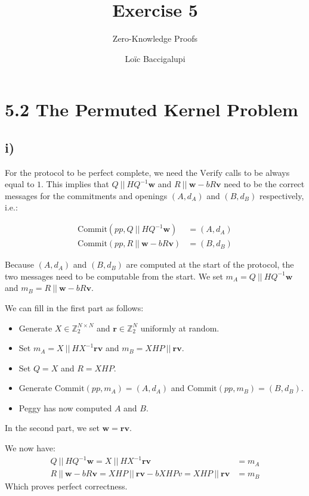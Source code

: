 \documentclass{scrartcl}
\title{Exercise 5}
\subtitle{Zero-Knowledge Proofs}
\author{Loïc Baccigalupi}
\begin{document}
\maketitle

\section*{5.2 The Permuted Kernel Problem}

\subsection*{i)}

For the protocol to be perfect complete, we need the $\text{Verify}$ calls to be always equal to $1$.
This implies that $Q\ ||\ HQ^{-1}\mathbf{w}$ and $R\ ||\ \mathbf{w} -bR\mathbf{v}$ need to be the correct messages for the commitments and openings $(A, d_A)$ and $(B, d_B)$ respectively, i.e.:

\begin{align*}
  \text{Commit}(pp, Q\ ||\ HQ^{-1}\mathbf{w}) &= (A, d_A) \\
  \text{Commit}(pp, R\ ||\ \mathbf{w} -bR\mathbf{v}) &= (B, d_B)
\end{align*}

Because $(A, d_A)$ and $(B, d_B)$ are computed at the start of the protocol, the two messages need to be computable from the start. We set $m_A = Q\ ||\ HQ^{-1}\mathbf{w}$ and $m_B = R\ ||\ \mathbf{w} -bR\mathbf{v}$.

We can fill in the first part as follows:
\begin{itemize}
  \item Generate $X \in \mathbb{Z}_2^{N \times N}$ and $\mathbf{r} \in \mathbb{Z}_2^N$ uniformly at random.
  \item Set $m_A = X\ ||\ HX^{-1}\mathbf{rv}$ and $m_B = XHP\ ||\ \mathbf{rv}$.
  \item Set $Q = X$ and $R = XHP$.
  \item Generate $\text{Commit}(pp, m_A) = (A, d_A)$ and $\text{Commit}(pp, m_B) = (B, d_B)$.
  \item Peggy has now computed $A$ and $B$.
\end{itemize}

In the second part, we set $\mathbf{w} = \mathbf{rv}$.

We now have:
\begin{align*}
  Q\ ||\ HQ^{-1}\mathbf{w} = X\ ||\ HX^{-1}\mathbf{rv} &= m_A \\
  R\ ||\ \mathbf{w} -bR\mathbf{v} = XHP\ ||\ \mathbf{rv} -bXHPv = XHP\ ||\ \mathbf{rv} &= m_B
\end{align*}
Which proves perfect correctness.
\end{document}
